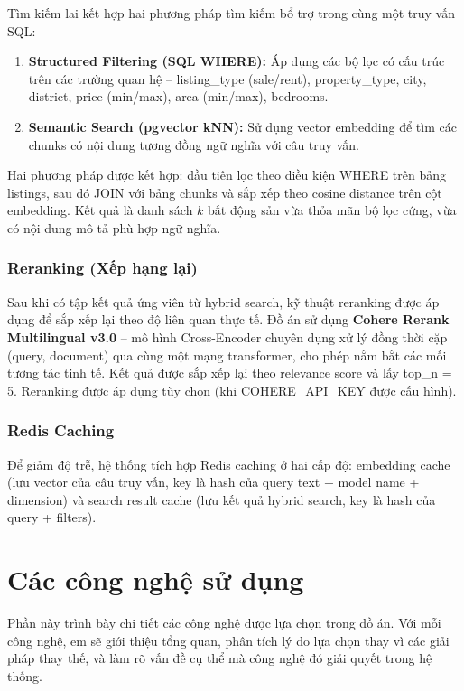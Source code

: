 Tìm kiếm lai kết hợp hai phương pháp tìm kiếm bổ trợ trong cùng một truy vấn SQL:

\begin{enumerate}
    \item \textbf{Structured Filtering (SQL WHERE):} Áp dụng các bộ lọc có cấu trúc trên các trường quan hệ -- listing\_type (sale/rent), property\_type, city, district, price (min/max), area (min/max), bedrooms.

    \item \textbf{Semantic Search (pgvector kNN):} Sử dụng vector embedding để tìm các chunks có nội dung tương đồng ngữ nghĩa với câu truy vấn.
\end{enumerate}

Hai phương pháp được kết hợp: đầu tiên lọc theo điều kiện WHERE trên bảng listings, sau đó JOIN với bảng chunks và sắp xếp theo cosine distance trên cột embedding. Kết quả là danh sách $k$ bất động sản vừa thỏa mãn bộ lọc cứng, vừa có nội dung mô tả phù hợp ngữ nghĩa.

\subsubsection*{Reranking (Xếp hạng lại)}

Sau khi có tập kết quả ứng viên từ hybrid search, kỹ thuật reranking được áp dụng để sắp xếp lại theo độ liên quan thực tế. Đồ án sử dụng \textbf{Cohere Rerank Multilingual v3.0} -- mô hình Cross-Encoder chuyên dụng xử lý đồng thời cặp (query, document) qua cùng một mạng transformer, cho phép nắm bắt các mối tương tác tinh tế. Kết quả được sắp xếp lại theo relevance score và lấy top\_n = 5. Reranking được áp dụng tùy chọn (khi COHERE\_API\_KEY được cấu hình).

\subsubsection*{Redis Caching}

Để giảm độ trễ, hệ thống tích hợp Redis caching ở hai cấp độ: embedding cache (lưu vector của câu truy vấn, key là hash của query text + model name + dimension) và search result cache (lưu kết quả hybrid search, key là hash của query + filters).

\section{Các công nghệ sử dụng}

Phần này trình bày chi tiết các công nghệ được lựa chọn trong đồ án. Với mỗi công nghệ, em sẽ giới thiệu tổng quan, phân tích lý do lựa chọn thay vì các giải pháp thay thế, và làm rõ vấn đề cụ thể mà công nghệ đó giải quyết trong hệ thống.

